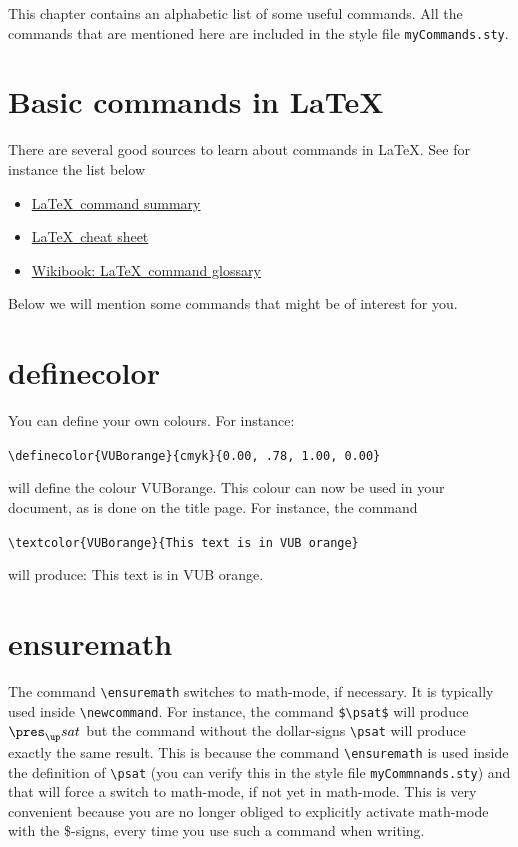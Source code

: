 \label{ch:usefulcommands}
This chapter contains an alphabetic list of some useful commands. All the commands that are mentioned here are included in the style file \verb|myCommands.sty|.

\section{Basic commands in \LaTeX}
There are several good sources to learn about commands in \LaTeX. See for instance the list below
\begin{itemize}
    \item \href{https://www.ntg.nl/doc/biemesderfer/ltxcrib.pdf}{\LaTeX\ command summary}
    \item \href{https://wch.github.io/latexsheet/}{\LaTeX\ cheat sheet}
    \item \href{https://en.wikibooks.org/wiki/LaTeX/Command_Glossary}{Wikibook: \LaTeX\ command glossary} 
\end{itemize}

Below we will mention some commands that might be of interest for you.

\section{definecolor}
You can define your own colours. For instance:

\verb|\definecolor{VUBorange}{cmyk}{0.00, .78, 1.00, 0.00}|

will define the colour VUBorange. This colour can now be used in your document, as is done on the title page. For instance, the command 

\verb|\textcolor{VUBorange}{This text is in VUB orange}|

will produce: \textcolor{VUBorange}{This text is in VUB orange}.

\section{ensuremath}
The command \verb|\ensuremath| switches to math-mode, if necessary. It is typically used inside \verb|\newcommand|. For instance, the command \verb|$\psat$| will produce $\psat$ but the command without the dollar-signs \verb|\psat| will produce exactly the same result. This is because the command \verb|\ensuremath| is used inside the definition of \verb|\psat| (you can verify this in the style file \verb|myCommnands.sty|) and that will force a switch to math-mode, if not yet in math-mode. This is very convenient because you are no longer obliged to explicitly activate math-mode with the \$-signs, every time you use such a command when writing.

